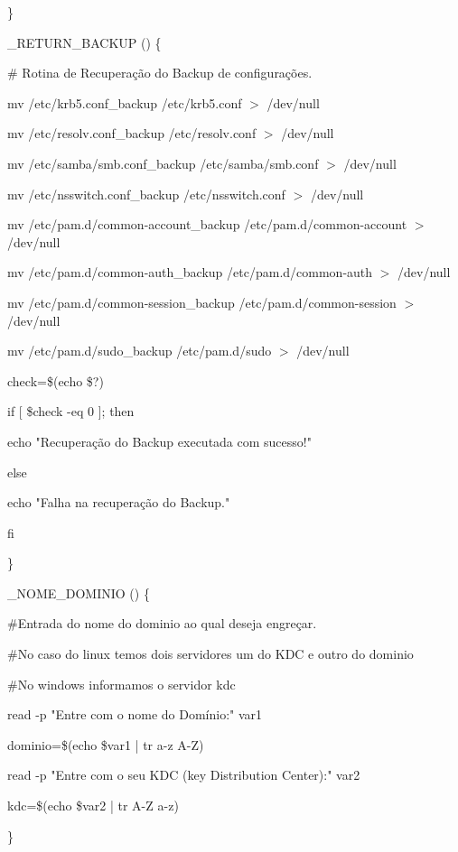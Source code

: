\}

\_RETURN\_BACKUP () \{

        \# Rotina de Recuperação do Backup de configurações.

        mv /etc/krb5.conf\_backup /etc/krb5.conf $>$ /dev/null

        mv /etc/resolv.conf\_backup /etc/resolv.conf $>$ /dev/null

        mv /etc/samba/smb.conf\_backup /etc/samba/smb.conf $>$ /dev/null

        mv /etc/nsswitch.conf\_backup /etc/nsswitch.conf $>$ /dev/null

        mv /etc/pam.d/common-account\_backup /etc/pam.d/common-account $>$ /dev/null

        mv /etc/pam.d/common-auth\_backup /etc/pam.d/common-auth $>$ /dev/null
        
        mv /etc/pam.d/common-session\_backup /etc/pam.d/common-session $>$ /dev/null

        mv /etc/pam.d/sudo\_backup /etc/pam.d/sudo $>$ /dev/null
         
        
				check=\$(echo \$?)

   if [ \$check -eq 0 ]; then

      echo "Recuperação do Backup executada com sucesso!"

   else

      echo "Falha na recuperação do Backup."

   fi
         
\}

\_NOME\_DOMINIO () \{
 
   \#Entrada do nome do dominio ao qual deseja engreçar.

	 \#No caso do linux temos dois servidores um do KDC e outro do dominio

	 \#No windows informamos o servidor kdc

    read -p "Entre com o nome do Domínio:" var1

    dominio=\$(echo \$var1 | tr a-z A-Z)

    read -p "Entre com o seu KDC (key Distribution Center):" var2

    kdc=\$(echo \$var2 | tr A-Z a-z)         

\}

